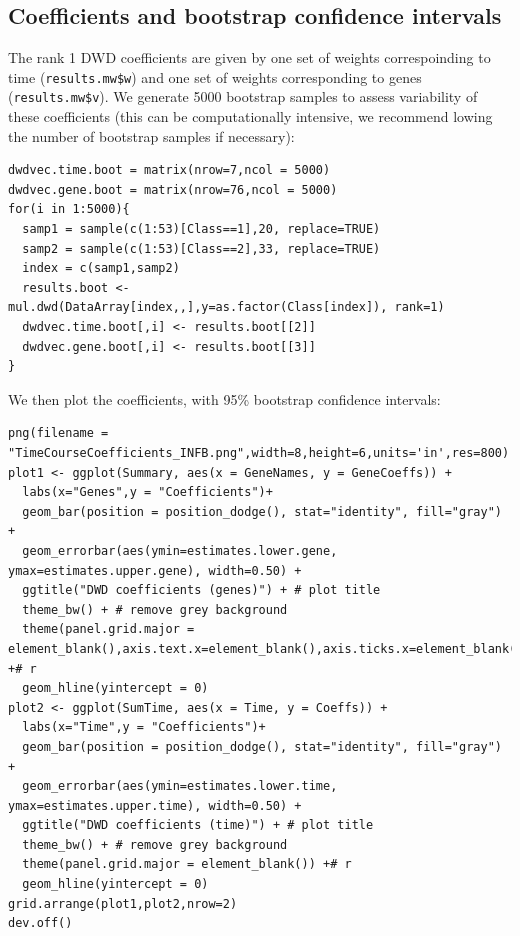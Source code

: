 \documentclass[]{article}
\begin{document}
\subsection{Coefficients and bootstrap confidence
intervals}\label{coefficients-and-bootstrap-confidence-intervals}

The rank 1 DWD coefficients are given by one set of weights
correspoinding to time (\texttt{results.mw\$w}) and one set of weights
corresponding to genes (\texttt{results.mw\$v}). We generate 5000
bootstrap samples to assess variability of these coefficients (this can
be computationally intensive, we recommend lowing the number of
bootstrap samples if necessary):

\begin{verbatim}
dwdvec.time.boot = matrix(nrow=7,ncol = 5000)
dwdvec.gene.boot = matrix(nrow=76,ncol = 5000)
for(i in 1:5000){
  samp1 = sample(c(1:53)[Class==1],20, replace=TRUE)
  samp2 = sample(c(1:53)[Class==2],33, replace=TRUE)
  index = c(samp1,samp2)
  results.boot <- mul.dwd(DataArray[index,,],y=as.factor(Class[index]), rank=1)
  dwdvec.time.boot[,i] <- results.boot[[2]]
  dwdvec.gene.boot[,i] <- results.boot[[3]]
}
\end{verbatim}

We then plot the coefficients, with 95\% bootstrap confidence intervals:

\begin{verbatim}
png(filename = "TimeCourseCoefficients_INFB.png",width=8,height=6,units='in',res=800)
plot1 <- ggplot(Summary, aes(x = GeneNames, y = GeneCoeffs)) +  
  labs(x="Genes",y = "Coefficients")+
  geom_bar(position = position_dodge(), stat="identity", fill="gray") + 
  geom_errorbar(aes(ymin=estimates.lower.gene, ymax=estimates.upper.gene), width=0.50) +
  ggtitle("DWD coefficients (genes)") + # plot title
  theme_bw() + # remove grey background 
  theme(panel.grid.major = element_blank(),axis.text.x=element_blank(),axis.ticks.x=element_blank()) +# r
  geom_hline(yintercept = 0)
plot2 <- ggplot(SumTime, aes(x = Time, y = Coeffs)) +  
  labs(x="Time",y = "Coefficients")+
  geom_bar(position = position_dodge(), stat="identity", fill="gray") + 
  geom_errorbar(aes(ymin=estimates.lower.time, ymax=estimates.upper.time), width=0.50) +
  ggtitle("DWD coefficients (time)") + # plot title
  theme_bw() + # remove grey background 
  theme(panel.grid.major = element_blank()) +# r
  geom_hline(yintercept = 0)
grid.arrange(plot1,plot2,nrow=2)
dev.off()
\end{verbatim}
\end{document}
